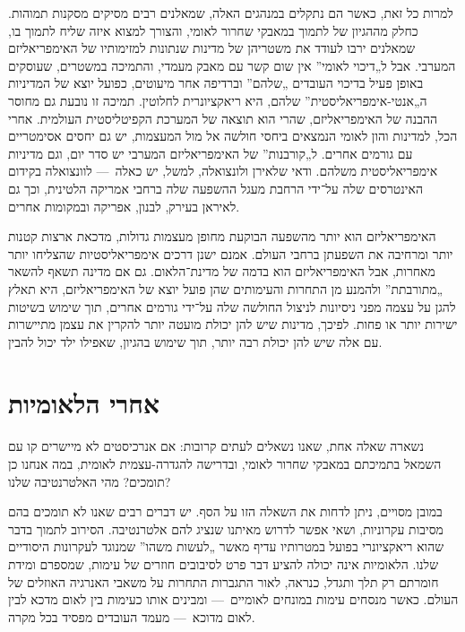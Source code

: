 למרות כל זאת, כאשר הם נתקלים במנהגים האלה, שמאלנים רבים מסיקים מסקנות תמוהות. כחלק מההגיון של לתמוך במאבקי שחרור לאומי, והצורך למצוא איזה שליח לתמוך בו, שמאלנים ירבו לעודד את משטריהן של מדינות שנתונות למזימותיו של האימפריאליזם המערבי. אבל ל„דיכוי לאומי” אין שום קשר עם מאבק מעמדי, והתמיכה במשטרים, שעוסקים באופן פעיל בדיכוי העובדים „שלהם” וברדיפה אחר מיעוטים, כפועל יוצא של המדיניות ה„אנטי-אימפריאליסטית” שלהם, היא ריאקציונרית לחלוטין. תמיכה זו נובעת גם מחוסר ההבנה של האימפריאליזם, שהרי הוא תוצאה של המערכת הקפיטליסטית העולמית. אחרי הכל, למדינות והון לאומי הנמצאים ביחסי חולשה אל מול המעצמות, יש גם יחסים אסימטריים עם גורמים אחרים. ל„קורבנות” של האימפריאליזם המערבי יש סדר יום, וגם מדיניות אימפריאליסטית משלהם. ודאי שלאירן ולונצואלה, למשל, יש כאלה~— לוונצואלה בקידום האינטרסים שלה על־ידי הרחבת מעגל ההשפעה שלה ברחבי אמריקה הלטינית, וכך גם לאיראן בעירק, לבנון, אפריקה ובמקומות אחרים.

האימפריאליזם הוא יותר מהשפעה הבוקעת מחופן מעצמות גדולות, מדכאת ארצות קטנות יותר ומרחיבה את השפעתן ברחבי העולם. אמנם ישנן דרכים אימפריאליסטיות שהצליחו יותר מאחרות, אבל האימפריאליזם הוא בדמה של מדינת־הלאום. גם אם מדינה תשאף להשאר „מתורבתת” ולהמנע מן התחרות והעימותים שהן פועל יוצא של האימפריאליזם, היא תאלץ להגן על עצמה מפני ניסיונות לניצול החולשה שלה על־ידי גורמים אחרים, תוך שימוש בשיטות ישירות יותר או פחות. לפיכך, מדינות שיש להן יכולת מועטה יותר להקרין את עצמן מתיישרות עם אלה שיש להן יכולת רבה יותר, תוך שימוש בהגיון, שאפילו ילד יכול להבין.



\section*{אחרי הלאומיות}

נשארה שאלה אחת, שאנו נשאלים לעתים קרובות: אם אנרכיסטים לא מיישרים קו עם השמאל בתמיכתם במאבקי שחרור לאומי, ובדרישה להגדרה-עצמית לאומית, במה אנחנו כן תומכים? מהי האלטרנטיבה שלנו?

במובן מסויים, ניתן לדחות את השאלה הזו על הסף. יש דברים רבים שאנו לא תומכים בהם מסיבות עקרוניות, ושאי אפשר לדרוש מאיתנו שנציג להם אלטרנטיבה. הסירוב לתמוך בדבר שהוא ריאקציונרי בפועל במטרותיו עדיף מאשר „לעשות משהו” שמנוגד לעקרונות היסודיים שלנו. הלאומיות אינה יכולה להציע דבר פרט לסיבובים חוזרים של עימות, שמספרם ומידת חומרתם רק תלך ותגדל, כנראה, לאור התגברות התחרות על משאבי האנרגיה האוזלים של העולם. כאשר מנסחים עימות במונחים לאומיים~— ומבינים אותו כעימות בין לאום מדכא לבין לאום מדוכא~— מעמד העובדים מפסיד בכל מקרה.

